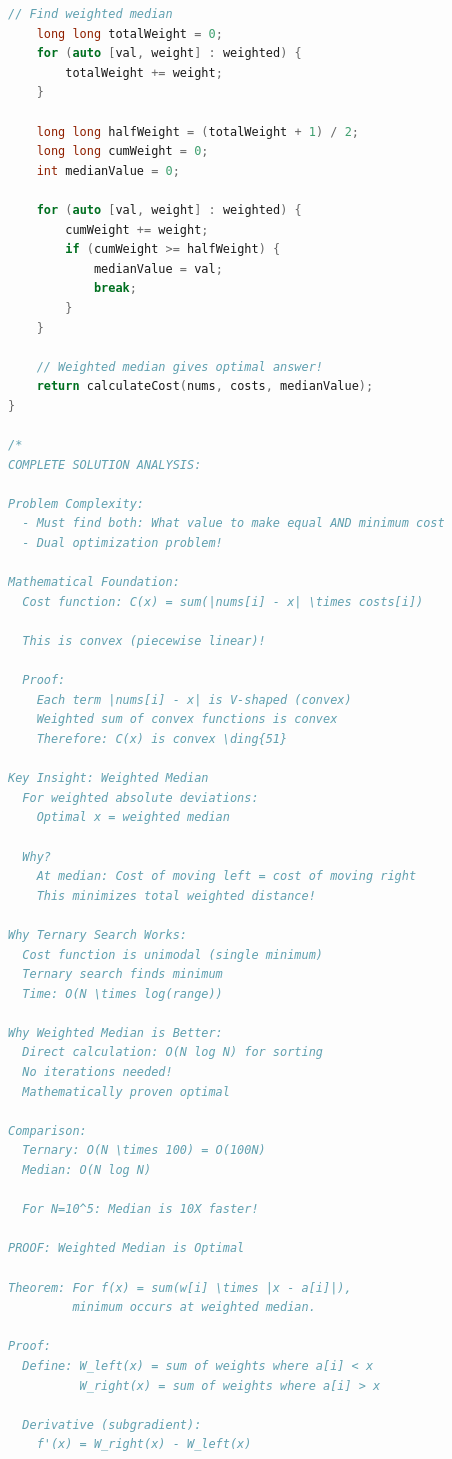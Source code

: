 \documentclass[11pt,a4paper,oneside]{book}
\begin{document}
\begin{lstlisting}[language=C++, caption=ELITE Problem 1 - Multi-Dimensional Binary Search]
    // Find weighted median
    long long totalWeight = 0;
    for (auto [val, weight] : weighted) {
        totalWeight += weight;
    }
    
    long long halfWeight = (totalWeight + 1) / 2;
    long long cumWeight = 0;
    int medianValue = 0;
    
    for (auto [val, weight] : weighted) {
        cumWeight += weight;
        if (cumWeight >= halfWeight) {
            medianValue = val;
            break;
        }
    }
    
    // Weighted median gives optimal answer!
    return calculateCost(nums, costs, medianValue);
}

/*
COMPLETE SOLUTION ANALYSIS:

Problem Complexity:
  - Must find both: What value to make equal AND minimum cost
  - Dual optimization problem!

Mathematical Foundation:
  Cost function: C(x) = sum(|nums[i] - x| \times costs[i])
  
  This is convex (piecewise linear)!
  
  Proof:
    Each term |nums[i] - x| is V-shaped (convex)
    Weighted sum of convex functions is convex
    Therefore: C(x) is convex \ding{51}

Key Insight: Weighted Median
  For weighted absolute deviations:
    Optimal x = weighted median
  
  Why?
    At median: Cost of moving left = cost of moving right
    This minimizes total weighted distance!

Why Ternary Search Works:
  Cost function is unimodal (single minimum)
  Ternary search finds minimum
  Time: O(N \times log(range))

Why Weighted Median is Better:
  Direct calculation: O(N log N) for sorting
  No iterations needed!
  Mathematically proven optimal

Comparison:
  Ternary: O(N \times 100) = O(100N)
  Median: O(N log N)
  
  For N=10^5: Median is 10X faster!

PROOF: Weighted Median is Optimal

Theorem: For f(x) = sum(w[i] \times |x - a[i]|), 
         minimum occurs at weighted median.

Proof:
  Define: W_left(x) = sum of weights where a[i] < x
          W_right(x) = sum of weights where a[i] > x
  
  Derivative (subgradient):
    f'(x) = W_right(x) - W_left(x)
  

\end{lstlisting}
\end{document}
